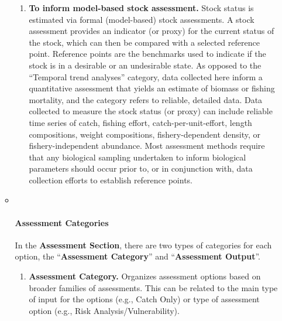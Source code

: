 \documentclass[
  11pt,
]{book}
\providecommand{\tightlist}{%
  \setlength{\itemsep}{0pt}\setlength{\parskip}{0pt}}
\begin{document}
\begin{itemize}
\begin{itemize}
\begin{enumerate}
    \item
      \textbf{To inform model-based stock assessment.} Stock status is estimated via formal (model-based) stock assessments. A stock assessment provides an indicator (or proxy) for the current status of the stock, which can then be compared with a selected reference point. Reference points are the benchmarks used to indicate if the stock is in a desirable or an undesirable state. As opposed to the ``Temporal trend analyses'' category, data collected here inform a quantitative assessment that yields an estimate of biomass or fishing mortality, and the category refers to reliable, detailed data. Data collected to measure the stock status (or proxy) can include reliable time series of catch, fishing effort, catch-per-unit-effort, length compositions, weight compositions, fishery-dependent density, or fishery-independent abundance. Most assessment methods require that any biological sampling undertaken to inform biological parameters should occur prior to, or in conjunction with, data collection efforts to establish reference points.
    \end{enumerate}
  \item ~
    \hypertarget{assessment-categories}{%
    \paragraph{Assessment Categories}\label{assessment-categories}}

    In the \textbf{Assessment Section}, there are two types of categories for each option, the ``\textbf{Assessment Category}'' and ``\textbf{Assessment Output}''.

    \begin{enumerate}
    \def\labelenumi{\arabic{enumi}.}
    \tightlist
    \item
      \textbf{Assessment Category.} Organizes assessment options based on broader families of assessments. This can be related to the main type of input for the options (e.g., Catch Only) or type of assessment option (e.g., Risk Analysis/Vulnerability).


\end{enumerate}
\end{itemize}
\end{itemize}
\end{document}
